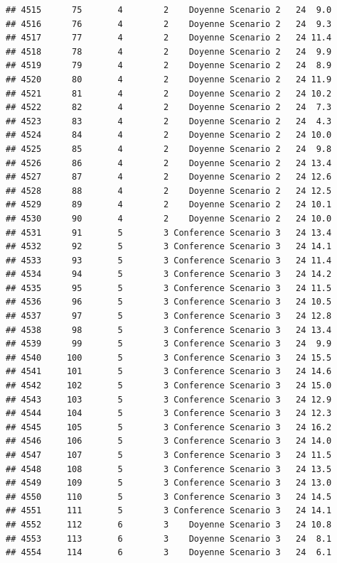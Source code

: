 \documentclass[
]{article}
\begin{document}
\begin{verbatim}
## 4515      75       4        2    Doyenne Scenario 2   24  9.0
## 4516      76       4        2    Doyenne Scenario 2   24  9.3
## 4517      77       4        2    Doyenne Scenario 2   24 11.4
## 4518      78       4        2    Doyenne Scenario 2   24  9.9
## 4519      79       4        2    Doyenne Scenario 2   24  8.9
## 4520      80       4        2    Doyenne Scenario 2   24 11.9
## 4521      81       4        2    Doyenne Scenario 2   24 10.2
## 4522      82       4        2    Doyenne Scenario 2   24  7.3
## 4523      83       4        2    Doyenne Scenario 2   24  4.3
## 4524      84       4        2    Doyenne Scenario 2   24 10.0
## 4525      85       4        2    Doyenne Scenario 2   24  9.8
## 4526      86       4        2    Doyenne Scenario 2   24 13.4
## 4527      87       4        2    Doyenne Scenario 2   24 12.6
## 4528      88       4        2    Doyenne Scenario 2   24 12.5
## 4529      89       4        2    Doyenne Scenario 2   24 10.1
## 4530      90       4        2    Doyenne Scenario 2   24 10.0
## 4531      91       5        3 Conference Scenario 3   24 13.4
## 4532      92       5        3 Conference Scenario 3   24 14.1
## 4533      93       5        3 Conference Scenario 3   24 11.4
## 4534      94       5        3 Conference Scenario 3   24 14.2
## 4535      95       5        3 Conference Scenario 3   24 11.5
## 4536      96       5        3 Conference Scenario 3   24 10.5
## 4537      97       5        3 Conference Scenario 3   24 12.8
## 4538      98       5        3 Conference Scenario 3   24 13.4
## 4539      99       5        3 Conference Scenario 3   24  9.9
## 4540     100       5        3 Conference Scenario 3   24 15.5
## 4541     101       5        3 Conference Scenario 3   24 14.6
## 4542     102       5        3 Conference Scenario 3   24 15.0
## 4543     103       5        3 Conference Scenario 3   24 12.9
## 4544     104       5        3 Conference Scenario 3   24 12.3
## 4545     105       5        3 Conference Scenario 3   24 16.2
## 4546     106       5        3 Conference Scenario 3   24 14.0
## 4547     107       5        3 Conference Scenario 3   24 11.5
## 4548     108       5        3 Conference Scenario 3   24 13.5
## 4549     109       5        3 Conference Scenario 3   24 13.0
## 4550     110       5        3 Conference Scenario 3   24 14.5
## 4551     111       5        3 Conference Scenario 3   24 14.1
## 4552     112       6        3    Doyenne Scenario 3   24 10.8
## 4553     113       6        3    Doyenne Scenario 3   24  8.1
## 4554     114       6        3    Doyenne Scenario 3   24  6.1

\end{verbatim}
\end{document}
